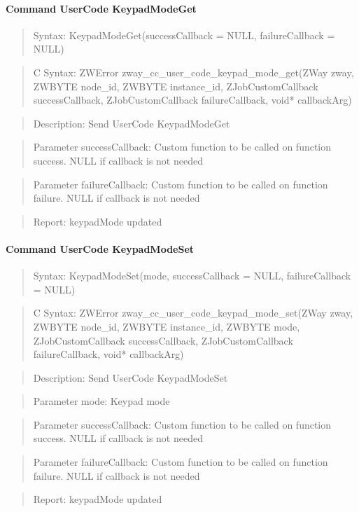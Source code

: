 \paragraph{Command UserCode KeypadModeGet}
\begin{quote}Syntax: KeypadModeGet(successCallback = NULL, failureCallback = NULL)\end{quote}
\begin{quote}C Syntax: ZWError zway\_cc\_user\_code\_keypad\_mode\_get(ZWay zway, ZWBYTE node\_id, ZWBYTE instance\_id, ZJobCustomCallback successCallback, ZJobCustomCallback failureCallback, void* callbackArg)\end{quote}
\begin{quote}Description: Send UserCode KeypadModeGet\end{quote}
\begin{quote}Parameter successCallback: Custom function to be called on function success. NULL if callback is not needed\end{quote}
\begin{quote}Parameter failureCallback: Custom function to be called on function failure. NULL if callback is not needed\end{quote}
\begin{quote}Report: keypadMode updated\end{quote}

\paragraph{Command UserCode KeypadModeSet}
\begin{quote}Syntax: KeypadModeSet(mode, successCallback = NULL, failureCallback = NULL)\end{quote}
\begin{quote}C Syntax: ZWError zway\_cc\_user\_code\_keypad\_mode\_set(ZWay zway, ZWBYTE node\_id, ZWBYTE instance\_id, ZWBYTE mode, ZJobCustomCallback successCallback, ZJobCustomCallback failureCallback, void* callbackArg)\end{quote}
\begin{quote}Description: Send UserCode KeypadModeSet\end{quote}
\begin{quote}Parameter mode: Keypad mode\end{quote}
\begin{quote}Parameter successCallback: Custom function to be called on function success. NULL if callback is not needed\end{quote}
\begin{quote}Parameter failureCallback: Custom function to be called on function failure. NULL if callback is not needed\end{quote}
\begin{quote}Report: keypadMode updated\end{quote}

